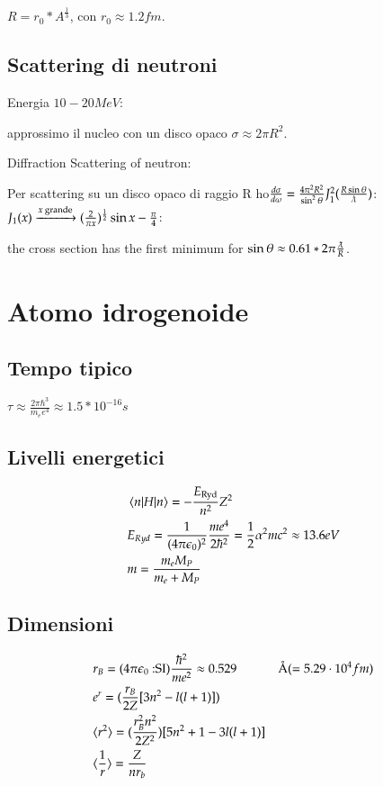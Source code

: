 \documentclass[main.tex]{subfiles}
\begin{document}
$R=r_0*A^{\frac{1}{3}}$, con $r_0\approx1.2 fm$.

\subsection{Scattering di neutroni}
Energia $10-20 MeV$:

approssimo il nucleo con un disco opaco $\sigma\approx2\pi R^2$.

Diffraction Scattering of neutron:

Per scattering su un disco opaco di raggio R ho$\frac{d\sigma}{d\omega}=\frac{4\pi^2R^2}{\sin^2{\theta}}J_1^2(\frac{R\sin{\theta}}{\lambdabar})$: $J_1(x)\xrightarrow{x\text{ grande}}(\frac{2}{\pi x})^{\frac{1}{2}}\sin{x-\frac{\pi}{4}}$:

the cross section has the first minimum for $\sin{\theta}\approx0.61*2\pi\frac{\lambdabar}{R}$.


\section{Atomo idrogenoide}

\subsection{Tempo tipico}
 $\tau\approx \frac{2\pi\hbar^3}{m_ee^4}\approx1.5*10^{-16} s$
 
\subsection{Livelli energetici}

\begin{align*}
&\braket{n|H|n}=-\frac{E_{\text{Ryd}}}{n^2}Z^2\\ &E_{Ryd}=\frac{1}{(4\pi\epsilon_0)^2}\frac{me^4}{2\hbar^2}=\frac{1}{2}\alpha^2mc^2\approx13.6eV\\
&m=\frac{m_eM_P}{m_e+M_P}
\end{align*}

\subsection{Dimensioni}

\begin{align*}
&r_B=(4\pi\epsilon_0 \text{ :SI})\frac{\hbar^2}{me^2}\approx0.529 &\textup{\AA} (=5.29 \cdot10^{4} fm)\\ &e^{r}=(\frac{r_B}{2Z}[3n^2-l(l+1)])\\ &\langle r^2 \rangle=(\frac{r_B^2n^2}{2Z^2})[5n^2+1-3l(l+1)]\\ &\langle \frac{1}{r} \rangle=\frac{Z}{nr_b}
\end{align*}
\end{document}
